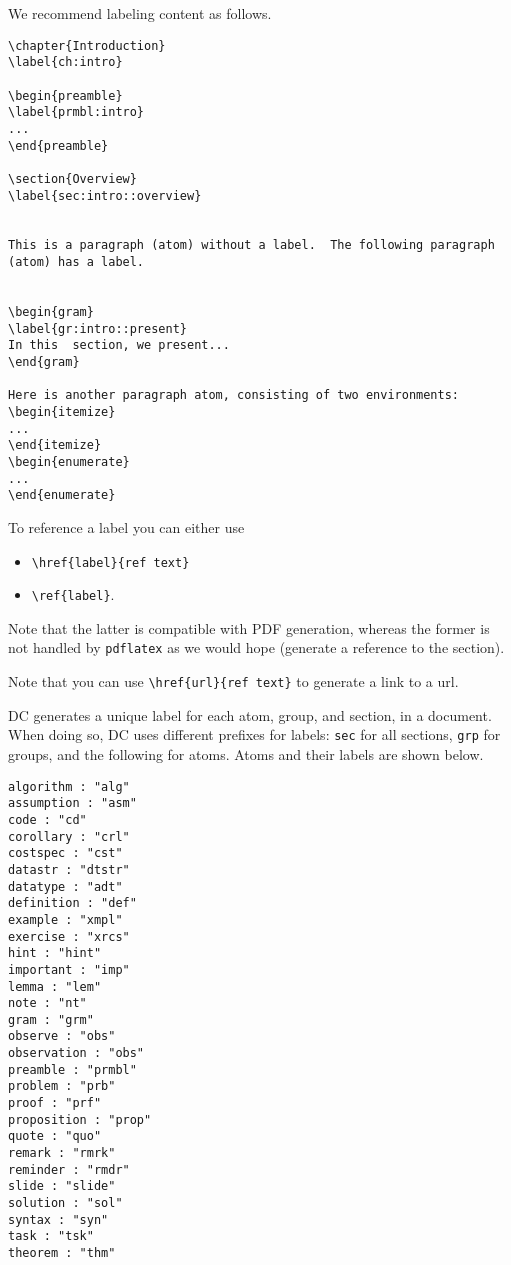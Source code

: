 \begin{example}

We recommend labeling content as follows.

\begin{lstlisting}
\chapter{Introduction}
\label{ch:intro}

\begin{preamble}
\label{prmbl:intro}
...
\end{preamble}

\section{Overview}
\label{sec:intro::overview}


This is a paragraph (atom) without a label.  The following paragraph (atom) has a label.


\begin{gram}
\label{gr:intro::present}
In this  section, we present...
\end{gram}

Here is another paragraph atom, consisting of two environments:
\begin{itemize}
...
\end{itemize}
\begin{enumerate}
...
\end{enumerate}

\end{lstlisting}
\end{example}

\begin{gram}[References]
To reference a label you can either use
\begin{itemize}
\item \lstinline`\href{label}{ref text}`
\item \lstinline`\ref{label}`.
\end{itemize}
%
Note that the latter is compatible with PDF generation, whereas the former is not handled by \lstinline`pdflatex` as we would hope (generate a reference to the section).

Note that you can use \lstinline`\href{url}{ref text}` to generate a link to a url.
\end{gram}

DC generates a unique label for each atom, group, and section, in a document.
%
When doing so, DC uses different prefixes for labels: \lstinline`sec` for all sections, \lstinline`grp` for groups, and the following for atoms.   Atoms and their labels are shown below.
%
\begin{lstlisting}
algorithm : "alg"
assumption : "asm"
code : "cd"
corollary : "crl"
costspec : "cst"
datastr : "dtstr"
datatype : "adt"
definition : "def"
example : "xmpl"
exercise : "xrcs"
hint : "hint"
important : "imp"
lemma : "lem"
note : "nt"
gram : "grm"
observe : "obs"
observation : "obs"
preamble : "prmbl"
problem : "prb"
proof : "prf"
proposition : "prop"
quote : "quo"
remark : "rmrk"
reminder : "rmdr"
slide : "slide"
solution : "sol"
syntax : "syn"
task : "tsk"
theorem : "thm"
\end{lstlisting}


